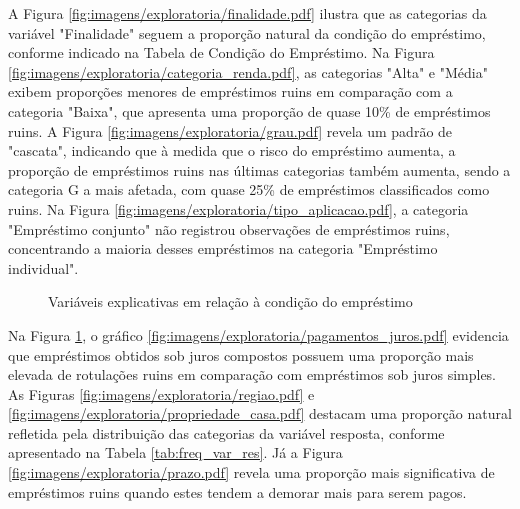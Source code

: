 A Figura \ref{fig:imagens/exploratoria/finalidade.pdf} ilustra que as categorias da variável "Finalidade" 
seguem a proporção natural da condição do empréstimo,
conforme indicado na Tabela de Condição do Empréstimo. Na Figura \ref{fig:imagens/exploratoria/categoria_renda.pdf}, 
as categorias "Alta" e "Média"
exibem proporções menores de empréstimos ruins em comparação com a categoria "Baixa", que apresenta uma proporção de quase 10\% 
de empréstimos ruins. A Figura \ref{fig:imagens/exploratoria/grau.pdf} revela um padrão de "cascata", indicando que à medida que o risco do 
empréstimo aumenta, a proporção de empréstimos ruins nas últimas categorias também aumenta, 
sendo a categoria G a mais afetada, com quase 25\% de empréstimos classificados como ruins. 
Na Figura \ref{fig:imagens/exploratoria/tipo_aplicacao.pdf}, a categoria "Empréstimo conjunto" 
não registrou observações de empréstimos ruins, 
concentrando a maioria desses empréstimos na categoria "Empréstimo individual".


\begin{figure}[H]
  \centering
  \vspace{.5cm}
  \vspace{.5cm}

  \caption{Variáveis explicativas em relação à condição do empréstimo}
  \label{fig:exp_bar2}
\end{figure}

Na Figura \ref{fig:exp_bar2}, o gráfico \ref{fig:imagens/exploratoria/pagamentos_juros.pdf} 
evidencia que empréstimos obtidos sob juros compostos possuem uma proporção 
mais elevada de rotulações ruins em comparação com empréstimos sob juros simples. As Figuras \ref{fig:imagens/exploratoria/regiao.pdf} 
e \ref{fig:imagens/exploratoria/propriedade_casa.pdf}
destacam uma proporção natural refletida pela distribuição das categorias da variável resposta, 
conforme apresentado na Tabela \ref{tab:freq_var_res}. Já a Figura \ref{fig:imagens/exploratoria/prazo.pdf} 
revela uma proporção mais significativa
de empréstimos ruins quando estes tendem a demorar mais para serem pagos.

